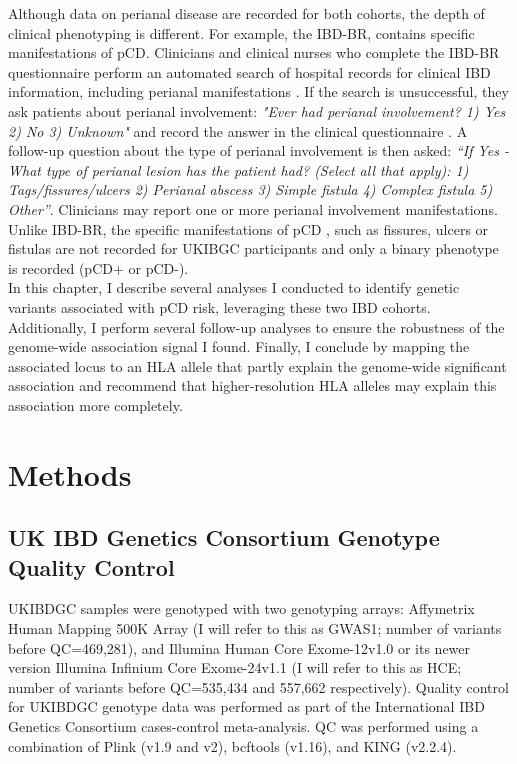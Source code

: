 Although data on perianal disease are recorded for both cohorts, the depth of clinical phenotyping is different. For example, the IBD-BR, contains specific manifestations of pCD. Clinicians and clinical nurses who complete the IBD-BR questionnaire perform an automated search of hospital records for clinical IBD information, including perianal manifestations \cite{ibdbr-protocol-v8}.  If the search is unsuccessful, they ask patients about perianal involvement: \textit{"Ever had perianal involvement? 1) Yes 2) No 3) Unknown"}  and record the answer in the clinical questionnaire \cite{ibdbr-questionnaire-v7}. A follow-up question about the type of perianal involvement is then asked: \textit{“If Yes - What type of perianal lesion has the patient had? (Select all that apply): 1) Tags/fissures/ulcers 2) Perianal abscess 3) Simple fistula 4) Complex fistula 5) Other”}. Clinicians may report one or more perianal involvement manifestations.  Unlike IBD-BR, the specific manifestations of pCD , such as fissures, ulcers or fistulas are not recorded for UKIBGC participants and only a binary phenotype is recorded (pCD+ or pCD-). \\

In this chapter, I describe several analyses I conducted to identify genetic variants associated with pCD risk, leveraging these two IBD cohorts. Additionally, I perform several follow-up analyses to ensure the robustness of the genome-wide association signal I found. Finally, I conclude by mapping the associated locus to an HLA allele that partly explain the genome-wide significant association and recommend that higher-resolution HLA alleles may explain this association more completely.

\section{Methods}
\subsection{UK IBD Genetics Consortium Genotype Quality Control}
UKIBDGC samples were genotyped with two genotyping arrays: Affymetrix Human Mapping 500K Array (I will refer to this as GWAS1; number of variants before QC=469,281), and Illumina Human Core Exome-12v1.0 or its newer version Illumina Infinium Core Exome-24v1.1 (I will refer to this as HCE; number of variants before QC=535,434 and 557,662 respectively). Quality control for UKIBDGC genotype data was performed as part of the International IBD Genetics Consortium cases-control meta-analysis. QC was performed using a combination of Plink (v1.9 and v2), bcftools (v1.16), and KING (v2.2.4).
